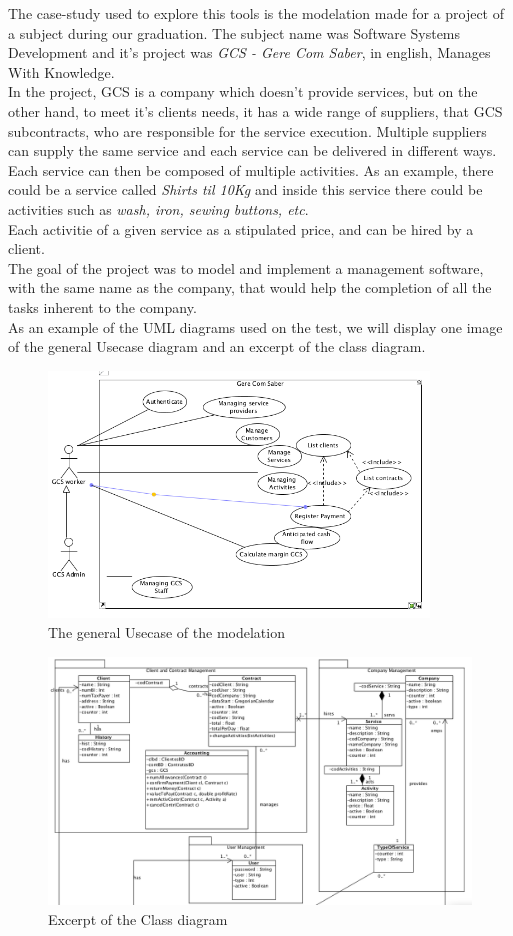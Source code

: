 The case-study used to explore this tools is the modelation made for a project of a subject during our graduation. The subject name was Software Systems Development and it's project was \textit{GCS - Gere Com Saber}, in english, Manages With Knowledge.\\
In the project, GCS is a company which doesn't provide services, but on the other hand, to meet it's clients needs, it has a wide range of suppliers, that GCS subcontracts, who are responsible for the service execution. Multiple suppliers can supply the same service and each  service can be delivered in different ways. Each service can then be composed of multiple activities. As an example, there could be a service called \textit{Shirts til 10Kg} and inside this service there could be activities such as \textit{wash, iron, sewing buttons, etc}.\\
Each activitie of a given service as a stipulated price, and can be hired by a client.\\
The goal of the project was to model and implement a management software, with the same name as the company, that would help the completion of all the tasks inherent to the company.\\

As an example of the UML diagrams used on the test, we will display one image of the general Usecase diagram and an excerpt of the class diagram.

\begin{figure}[H]
\begin{center}
\includegraphics[width=0.9\textwidth]{images/usecase.png}
\caption{The general Usecase of the modelation}\label{img:usecase}
\end{center}
\end{figure} 

\begin{figure}[H]
\begin{center}
\includegraphics[scale=0.35]{images/classbw.png}
\caption{Excerpt of the Class diagram}\label{img:class}
\end{center}
\end{figure} 
